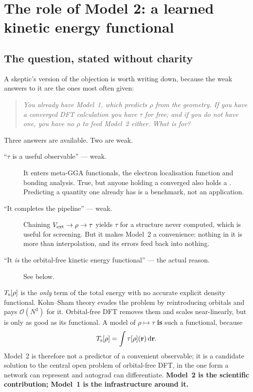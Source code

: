 \chapter{The role of Model 2: a learned kinetic energy functional}
\label{ch:model2}

\section{The question, stated without charity}

A skeptic's version of the objection is worth writing down, because the weak
answers to it are the ones most often given:

\begin{quote}
\itshape
You already have Model~1, which predicts $\rho$ from the geometry. If you have
a converged DFT calculation you have $\tau$ for free; and if you do not have
one, you have no $\rho$ to feed Model~2 either. What is 
\emph{for}?
\end{quote}

Three answers are available. Two are weak.

\begin{description}
  \item[``$\tau$ is a useful observable'' --- weak.] It enters meta-GGA
    functionals, the electron localisation function and bonding analysis. True,
    but anyone holding a converged  also holds a .
    Predicting a quantity one already has is a benchmark, not an application.
  \item[``It completes the pipeline'' --- weak.] Chaining
    $V_{\mathrm{ext}}\to\rho\to\tau$ yields $\tau$ for a structure never computed, which
    is useful for screening. But it makes Model~2 a convenience: nothing in it
    is more than interpolation, and its errors feed back into nothing.
  \item[``It \emph{is} the orbital-free kinetic energy functional'' --- the
    actual reason.] See below.
\end{description}

$T_{\mathrm{s}}[\rho]$ is the \emph{only} term of the total energy with no accurate
explicit density functional. Kohn--Sham theory evades the problem by
reintroducing orbitals and pays $\mathcal{O}(N^3)$ for it. Orbital-free DFT
removes them and scales near-linearly, but is only as good as its functional.
A model of $\rho\mapsto\tau$ \textbf{is} such a functional, because
\begin{equation}
  T_{\mathrm{s}}[\rho] = \int \tau[\rho](\mathbf{r})\,\mathrm{d}\mathbf{r} .
\end{equation}
Model~2 is therefore not a predictor of a convenient observable; it is a
candidate solution to the central open problem of orbital-free DFT, in the one
form a network can represent and autograd can differentiate. \textbf{Model~2 is
the scientific contribution; Model~1 is the infrastructure around it.}

